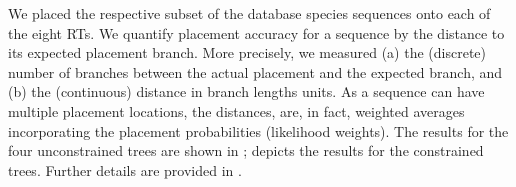 We placed the respective subset of the  database species sequences onto each of the eight \acp{RT}.
We quantify placement accuracy for a sequence by the distance to its expected placement branch.
More precisely, we measured (a) the (discrete) number of branches between the actual placement and the expected branch,
and (b) the (continuous) distance in branch lengths units.
As a sequence can have multiple placement locations, the distances, are, in fact, weighted averages incorporating
the placement probabilities (likelihood weights).
The results for the four unconstrained trees are shown in ;
 depicts the results for the constrained trees.
Further details are provided in .


